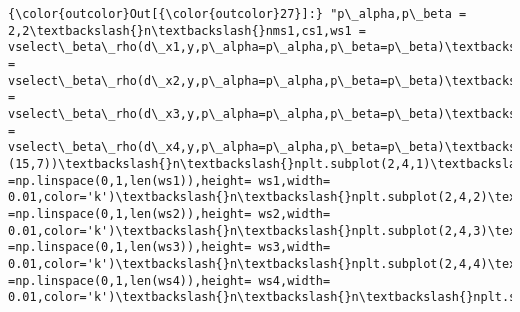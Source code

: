 \documentclass[11pt]{article}
\begin{document}
\begin{Verbatim}[commandchars=\\\{\}]
{\color{outcolor}Out[{\color{outcolor}27}]:} "p\_alpha,p\_beta = 2,2\textbackslash{}n\textbackslash{}nms1,cs1,ws1 = vselect\_beta\_rho(d\_x1,y,p\_alpha=p\_alpha,p\_beta=p\_beta)\textbackslash{}nms2,cs2,ws2 = vselect\_beta\_rho(d\_x2,y,p\_alpha=p\_alpha,p\_beta=p\_beta)\textbackslash{}nms3,cs3,ws3 = vselect\_beta\_rho(d\_x3,y,p\_alpha=p\_alpha,p\_beta=p\_beta)\textbackslash{}nms4,cs4,ws4 = vselect\_beta\_rho(d\_x4,y,p\_alpha=p\_alpha,p\_beta=p\_beta)\textbackslash{}n\textbackslash{}nplt.figure(figsize=(15,7))\textbackslash{}n\textbackslash{}nplt.subplot(2,4,1)\textbackslash{}nddplt.bar(x =np.linspace(0,1,len(ws1)),height= ws1,width= 0.01,color='k')\textbackslash{}n\textbackslash{}nplt.subplot(2,4,2)\textbackslash{}nplt.bar(x =np.linspace(0,1,len(ws2)),height= ws2,width= 0.01,color='k')\textbackslash{}n\textbackslash{}nplt.subplot(2,4,3)\textbackslash{}nplt.bar(x =np.linspace(0,1,len(ws3)),height= ws3,width= 0.01,color='k')\textbackslash{}n\textbackslash{}nplt.subplot(2,4,4)\textbackslash{}nplt.bar(x =np.linspace(0,1,len(ws4)),height= ws4,width= 0.01,color='k')\textbackslash{}n\textbackslash{}n\textbackslash{}nplt.subplot(2,4,5)\textbackslash{}n\#plt.title('f1')\textbackslash{}ncil95s(ms1,cs1,ws1,x1,d\_x1,y1)\textbackslash{}n\textbackslash{}nplt.subplot(2,4,6)\textbackslash{}n\#plt.title('f2')\textbackslash{}ncil95s(ms2,cs2,ws2,x2,d\_x2,y2)\textbackslash{}n\textbackslash{}nplt.subplot(2,4,7)\textbackslash{}n\#plt.title('f3')\textbackslash{}ncil95s(ms3,cs3,ws3,x3,d\_x3,y3)\textbackslash{}n\textbackslash{}nplt.subplot(2,4,8)\textbackslash{}n\#plt.title('f4')\textbackslash{}ncil95s(ms4,cs4,ws4,x4,d\_x4,y4)\textbackslash{}n\textbackslash{}n"
\end{Verbatim}
            
\end{document}
